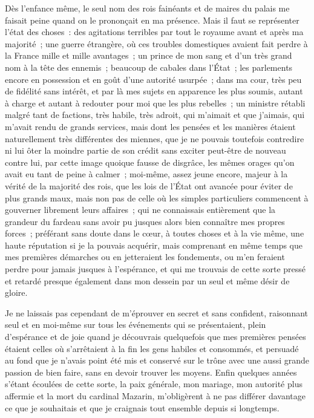 \documentclass[french,twoside]{book} %
\begin{document}
Dès l’enfance même, le seul nom des rois fainéants et de maires du palais me faisait peine quand on le prononçait en ma présence. Mais il faut se représenter l’état des choses : des agitations terribles par tout le royaume avant et après ma majorité ; une guerre étrangère, où ces troubles domestiques avaient fait perdre à la France mille et mille avantages ; un prince de mon sang et d’un très grand nom à la tête des ennemis ; beaucoup de cabales dans l’État ; les parlements encore en possession et en goût d’une autorité usurpée ; dans ma cour, très peu de fidélité sans intérêt, et par là mes sujets en apparence les plus soumis, autant à charge et autant à redouter pour moi que les plus rebelles ; un ministre rétabli malgré tant de factions, très habile, très adroit, qui m’aimait et que j’aimais, qui m’avait rendu de grands services, mais dont les pensées et les manières étaient naturellement très différentes des miennes, que je ne pouvais toutefois contredire ni lui ôter la moindre partie de son crédit sans exciter peut-être de nouveau contre lui, par cette image quoique fausse de disgrâce, les mêmes orages qu’on avait eu tant de peine à calmer ; moi-même, assez jeune encore, majeur à la vérité de la majorité des rois, que les lois de l’État ont avancée pour éviter de plus grands maux, mais non pas de celle où les simples particuliers commencent à gouverner librement leurs affaires ; qui ne connaissais entièrement que la grandeur du fardeau sans avoir pu jusques alors bien connaître mes propres forces ; préférant sans doute dans le cœur, à toutes choses et à la vie même, une haute réputation si je la pouvais acquérir, mais comprenant en même temps que mes premières démarches ou en jetteraient les fondements, ou m’en feraient perdre pour jamais jusques à l’espérance, et qui me trouvais de cette sorte pressé et retardé presque également dans mon dessein par un seul et même désir de gloire.\par
Je ne laissais pas cependant de m’éprouver en secret et sans confident, raisonnant seul et en moi-même sur tous les événements qui se présentaient, plein d’espérance et de joie quand je découvrais quelquefois que mes premières pensées étaient celles où s’arrêtaient à la fin les gens habiles et consommés, et persuadé au fond que je n’avais point été mis et conservé sur le trône avec une aussi grande passion de bien faire, sans en devoir trouver les moyens. Enfin quelques années s’étant écoulées de cette sorte, la paix générale, mon mariage, mon autorité plus affermie et la mort du cardinal Mazarin, m’obligèrent à ne pas différer davantage ce que je souhaitais et que je craignais tout ensemble depuis si longtemps.\par
\end{document}
